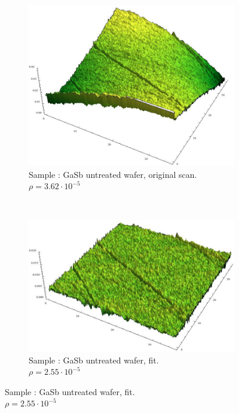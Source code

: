 \label{samples}
\begin{figure}
    \vspace{-2em}
    \centering
     \begin{subfigure}{0.4\columnwidth}
         \includegraphics[width=\textwidth]{Bilder/s1_raw_orig.jpg}
         \caption{Sample : GaSb untreated wafer, original scan.  
         $\rho = 3.62 \cdot 10^{-5}$}
        \label{s1_orig}
    \end{subfigure}
    ~
    \begin{subfigure}{0.4\columnwidth}
         \includegraphics[width=\textwidth]{Bilder/s1_raw_f.jpg}
         \caption{Sample : GaSb untreated wafer, fit.\\  $\rho = 2.55 
         \cdot 10^{-5}$}
        \label{s1_flat}
    \end{subfigure}


\end{figure}
